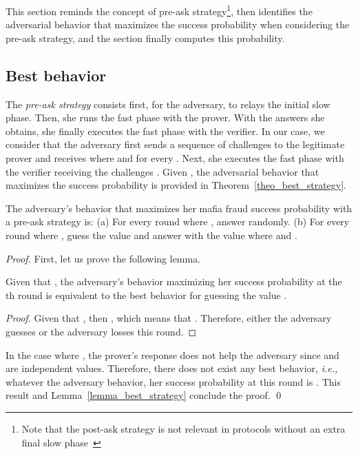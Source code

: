 \documentclass{llncs}
\begin{document}
This section reminds the concept of pre-ask strategy\footnote{Note that the 
post-ask strategy is not relevant in protocols without an extra final slow 
phase~\cite{AvoineBKLM-2011-jcs}}, then identifies the adversarial behavior 
that maximizes the success probability when considering the pre-ask strategy, 
and the section finally computes this probability.

\subsection{Best behavior}

The \emph{pre-ask strategy} consists first, for the adversary, to relays the 
initial slow phase. Then, she runs the fast phase with the prover. With the 
answers she obtains, she finally executes the fast phase with the verifier. In 
our case, we consider that the adversary first sends a sequence of challenges 
 to the legitimate prover and receives 
 where  and  for every . Next, she executes the fast phase with the verifier receiving 
the challenges . Given , the adversarial 
behavior that maximizes the success probability is provided in 
Theorem~\ref{theo_best_strategy}.


\begin{theorem}\label{theo_best_strategy}
The adversary's behavior that maximizes her mafia fraud success probability 
with a pre-ask strategy is: (a) For every round  where , answer randomly. (b) For every round  where , guess the value  and answer 
with the value  where  and .
\end{theorem}

\begin{proof}

First, let us prove the following lemma.

\begin{lemma}\label{lemma_best_strategy}
Given that , the adversary's behavior maximizing her success 
probability at the th round is equivalent to the best behavior for guessing 
the value .
\end{lemma}

\begin{proof}
Given that , then , which 
means that . 
Therefore, either the adversary guesses  or 
the adversary losses this round.
\end{proof}

In the case where , the prover's response  
does not help the adversary since  and  are 
independent values. Therefore, there does not exist any best behavior, 
\emph{i.e.,} whatever the adversary behavior, her success probability at this 
round is . This result and Lemma~\ref{lemma_best_strategy} 
conclude the proof. \qed
\end{proof}
\end{document}

